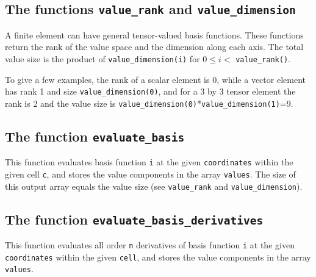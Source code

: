 
\subsection{The functions \texttt{value\_rank} and \texttt{value\_dimension}}
A finite element can have general tensor-valued basis functions.
These functions return the rank of the value space and the dimension along each axis.
The total value size is the product of \texttt{value\_dimension(i)} for $0 \le i <$ \texttt{value\_rank()}.

To give a few examples, the rank of a scalar element is 0, while a vector element has rank 1 and size \texttt{value\_dimension(0)}, 
and for a 3 by 3 tensor element the rank is 2 and the value size is \texttt{value\_dimension(0)}*\texttt{value\_dimension(1)}=9.


\subsection{The function \texttt{evaluate\_basis}}
This function evaluates basis function \texttt{i} at the given \texttt{coordinates}
within the given cell \texttt{c}, and stores the value components in the array \texttt{values}.
The size of this output array equals the value size (see \texttt{value\_rank} and \texttt{value\_dimension}).


\subsection{The function \texttt{evaluate\_basis\_derivatives}}
This function evaluates all order \texttt{n} derivatives of basis function \texttt{i}
at the given \texttt{coordinates} within the given \texttt{cell},
and stores the value components in the array \texttt{values}.

